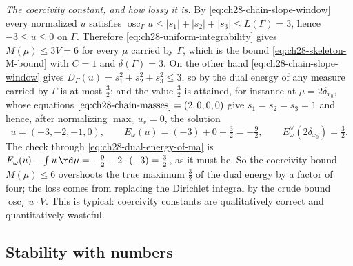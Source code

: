 \begin{example}[{The chain \(\Gamma=[0,3]\): a solved equation, verified}]
\emph{The coercivity constant, and how lossy it is.}  By
\eqref{eq:ch28-chain-slope-window} every normalized \(u\) satisfies
\(\operatorname{osc}_\Gamma u\leq|s_1|+|s_2|+|s_3|\leq L(\Gamma)=3\), hence
\(-3\leq u\leq0\) on \(\Gamma\).  Therefore
\eqref{eq:ch28-uniform-integrability} gives \(M(\mu)\leq3V=6\) for every
\(\mu\) carried by \(\Gamma\), which is the bound
\eqref{eq:ch28-skeleton-M-bound} with \(C=1\) and
\(\delta(\Gamma)=3\).  On the other hand
\eqref{eq:ch28-chain-slope-window} gives
\(D_\Gamma(u)=s_1^2+s_2^2+s_3^2\leq3\), so by
 the dual energy of any measure carried by
\(\Gamma\) is at most \(\tfrac32\); and the value \(\tfrac32\) is attained,
for instance at \(\mu=2\delta_{x_0}\), whose equations
\(\eqref{eq:ch28-chain-masses}=(2,0,0,0)\) give
\(s_1=s_2=s_3=1\) and hence, after normalizing \(\max_vu_v=0\), the solution
\[
 u=(-3,-2,-1,0),
 \qquad
 E_\omega(u)=(-3)+0-\tfrac32=-\tfrac92,
 \qquad
 E^\vee_\omega(2\delta_{x_0})=\tfrac32 .
\]
The check through \eqref{eq:ch28-dual-energy-of-ma} is
\(E_\omega(u)-\int u\,\rd\mu=-\tfrac92-2\cdot(-3)=\tfrac32\), as it must be.
So the coercivity bound \(M(\mu)\leq6\) overshoots the true maximum
\(\tfrac32\) of the dual energy by a factor of four; the loss comes from
replacing the Dirichlet integral by the crude bound
\(\operatorname{osc}_\Gamma u\cdot V\).  This is typical: coercivity
constants are qualitatively correct and quantitatively wasteful.
\end{example}

\subsection{Stability with numbers}
\label{sec:ch28-stability-numbers}

